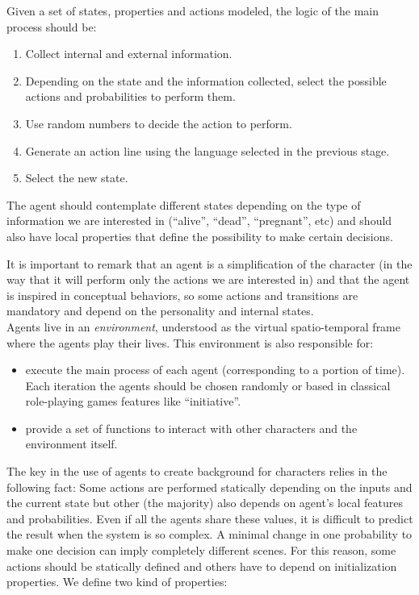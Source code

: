 \documentclass{sig-alternate}
\begin{document}
Given a set of states, properties and actions modeled, the logic of the main process should be:

\begin{enumerate}
\item Collect internal and external information.
\item Depending on the state and the information collected, select the possible actions and probabilities to perform them.
\item Use random numbers to decide the action to perform.
\item Generate an action line using the language selected in the previous stage.
\item Select the new state.
\end{enumerate}


The agent should contemplate different states depending on the type of information we are interested in (``alive'', ``dead'', ``pregnant'', etc) and should also have local properties that define the possibility to make certain decisions.

It is important to remark that an agent is a simplification of the character (in the way that it will perform only the actions we are interested in) and that the agent is inspired in conceptual behaviors, so some actions and transitions are mandatory and depend on the personality and internal states.\\


Agents live in an {\em environment}, understood as the virtual spatio-temporal frame where the agents play their lives. This environment is also responsible for:
\begin{itemize}
\item execute the main process of each agent (corresponding to a portion of time). Each iteration the agents should be chosen randomly or based in classical role-playing games features like ``initiative''.
\item provide a set of functions to interact with other characters and the environment itself.
\end{itemize}



The key in the use of agents to create background for characters relies in the following fact: Some actions are performed statically depending on the inputs and the current state but other (the majority) also depends on agent's local features and probabilities. Even if all the agents share these values, it is difficult to predict the result when the system is so complex. A minimal change in one probability to make one decision can imply completely different scenes.
For this reason, some actions should be statically defined and others have to depend on initialization properties. We define two kind of properties:
\end{document}
